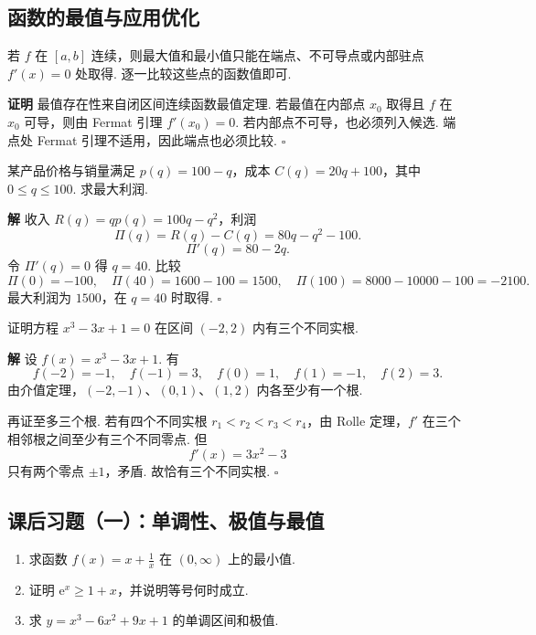 \documentclass[fontset=fandol]{ctexart}
\newenvironment{proofdetail}{\par\noindent\textbf{证明}\quad}{\hfill$\square$\par\vspace{0.8em}}
\newenvironment{solution}{\par\noindent\textbf{解}\quad}{\hfill$\square$\par\vspace{0.8em}}
\newcommand{\ee}{\mathrm{e}}
\begin{document}
\subsection{函数的最值与应用优化}

\begin{proposition}[闭区间最值求法]
若 $f$ 在 $[a,b]$ 连续，则最大值和最小值只能在端点、不可导点或内部驻点 $f'(x)=0$ 处取得. 逐一比较这些点的函数值即可.
\end{proposition}
\begin{proofdetail}
最值存在性来自闭区间连续函数最值定理. 若最值在内部点 $x_0$ 取得且 $f$ 在 $x_0$ 可导，则由 Fermat 引理 $f'(x_0)=0$. 若内部点不可导，也必须列入候选. 端点处 Fermat 引理不适用，因此端点也必须比较.
\end{proofdetail}

\begin{example}[利润最大化]
某产品价格与销量满足 $p(q)=100-q$，成本 $C(q)=20q+100$，其中 $0\leq q\leq100$. 求最大利润.
\end{example}
\begin{solution}
收入 $R(q)=qp(q)=100q-q^2$，利润
\[
\Pi(q)=R(q)-C(q)=80q-q^2-100.
\]
\[
\Pi'(q)=80-2q.
\]
令 $\Pi'(q)=0$ 得 $q=40$. 比较
\[
\Pi(0)=-100,\quad \Pi(40)=1600-100=1500,\quad \Pi(100)=8000-10000-100=-2100.
\]
最大利润为 $1500$，在 $q=40$ 时取得.
\end{solution}

\begin{example}[证明方程根的个数]
证明方程 $x^3-3x+1=0$ 在区间 $(-2,2)$ 内有三个不同实根.
\end{example}
\begin{solution}
设 $f(x)=x^3-3x+1$. 有
\[
f(-2)=-1,\quad f(-1)=3,\quad f(0)=1,\quad f(1)=-1,\quad f(2)=3.
\]
由介值定理，$(-2,-1)$、$(0,1)$、$(1,2)$ 内各至少有一个根.

再证至多三个根. 若有四个不同实根 $r_1<r_2<r_3<r_4$，由 Rolle 定理，$f'$ 在三个相邻根之间至少有三个不同零点. 但
\[
f'(x)=3x^2-3
\]
只有两个零点 $\pm1$，矛盾. 故恰有三个不同实根.
\end{solution}

\subsection{课后习题（一）：单调性、极值与最值}
\begin{enumerate}[label=\textbf{练习\arabic*.},leftmargin=2.2em]
\item 求函数 $f(x)=x+\frac1x$ 在 $(0,\infty)$ 上的最小值.
\item 证明 $\ee^x\geq1+x$，并说明等号何时成立.
\item 求 $y=x^3-6x^2+9x+1$ 的单调区间和极值.
\end{enumerate}
\end{document}
